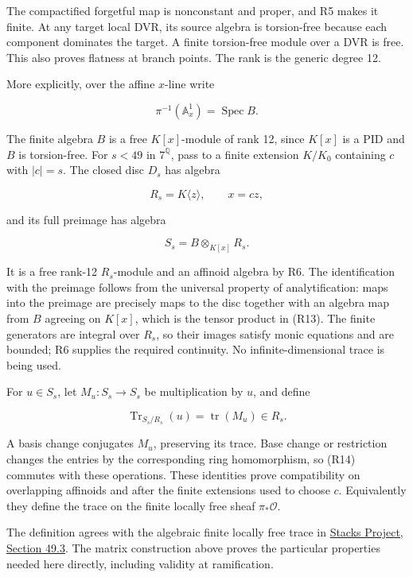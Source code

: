 \documentclass[11pt,a4paper]{article}
\begin{document}
The compactified forgetful map is nonconstant and proper, and R5 makes it finite. At any target local DVR, its source algebra is torsion-free because each component dominates the target. A finite torsion-free module over a DVR is free. This also proves flatness at branch points. The rank is the generic degree 12.

More explicitly, over the affine \(x\)-line write

\[
\pi^{-1}(\mathbb A^1_x)=\operatorname{Spec}B.
\]

The finite algebra \(B\) is a free \(K[x]\)-module of rank 12, since \(K[x]\) is a PID and \(B\) is torsion-free. For \(s<49\) in \(7^{\mathbb Q}\), pass to a finite extension \(K/K_0\) containing \(c\) with \(|c|=s\). The closed disc \(D_s\) has algebra

\[
R_s=K\langle z\rangle,\qquad x=cz,
\]

and its full preimage has algebra

\[
S_s=B\otimes_{K[x]}R_s.
\tag{R13}
\]

It is a free rank-12 \(R_s\)-module and an affinoid algebra by R6. The identification with the preimage follows from the universal property of analytification: maps into the preimage are precisely maps to the disc together with an algebra map from \(B\) agreeing on \(K[x]\), which is the tensor product in (R13). The finite generators are integral over \(R_s\), so their images satisfy monic equations and are bounded; R6 supplies the required continuity. No infinite-dimensional trace is being used.

For \(u\in S_s\), let \(M_u:S_s\to S_s\) be multiplication by \(u\), and define

\[
\operatorname{Tr}_{S_s/R_s}(u)=\operatorname{tr}(M_u)\in R_s.
\tag{R14}
\]

A basis change conjugates \(M_u\), preserving its trace. Base change or restriction changes the entries by the corresponding ring homomorphism, so (R14) commutes with these operations. These identities prove compatibility on overlapping affinoids and after the finite extensions used to choose \(c\). Equivalently they define the trace on the finite locally free sheaf \(\pi_*\mathcal O\).

The definition agrees with the algebraic finite locally free trace in \href{https://stacks.math.columbia.edu/tag/0BVH}{Stacks Project, Section 49.3}. The matrix construction above proves the particular properties needed here directly, including validity at ramification.
\end{document}
